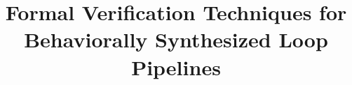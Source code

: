 \documentclass[letterpaper]{llncs}
\begin{document}
\mainmatter  %

\title{Formal Verification Techniques for Behaviorally Synthesized Loop Pipelines}



\maketitle












\end{document}
